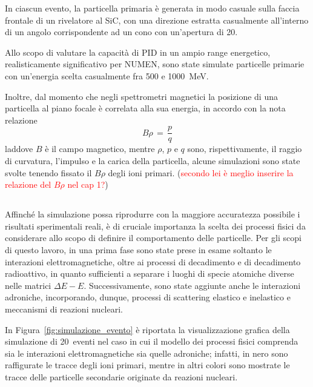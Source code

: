 In ciascun evento, la particella primaria è generata in modo casuale sulla faccia frontale di un rivelatore al SiC, con una direzione estratta casualmente all'interno di un angolo corrispondente ad un cono con un'apertura di 20\textdegree{}. 


Allo scopo di valutare la capacità di PID in un ampio range energetico, realisticamente significativo per NUMEN, sono state simulate particelle primarie con un'energia scelta casualmente fra 500 e 1000~MeV.

Inoltre, dal momento che negli spettrometri magnetici la posizione di una particella al piano focale è correlata alla sua energia, in accordo con la nota relazione
\begin{equation} \label{eq:legge_spettrometri}
B  \rho \, = \,  \frac{p}{q}
\end{equation}
laddove $B$ è il campo magnetico, mentre $\rho$, $p$ e $q$ sono, rispettivamente, il raggio di curvatura, l'impulso e la carica della particella, alcune simulazioni sono state svolte tenendo fissato il $B \rho$ degli ioni primari.
(\textcolor{red}{secondo lei è meglio inserire la relazione del $B \rho $ nel cap 1?})


\subsection{}


Affinché la simulazione possa riprodurre con la maggiore accuratezza possibile i risultati sperimentali reali, è di cruciale importanza la scelta dei processi fisici da considerare allo scopo di definire il comportamento delle particelle.
Per gli scopi di questo lavoro, in una prima fase sono state prese in esame soltanto le interazioni elettromagnetiche, oltre ai processi di decadimento e di decadimento radioattivo, in quanto sufficienti a separare i luoghi di specie atomiche diverse nelle matrici $\Delta E - E$.
Successivamente, sono state aggiunte anche le interazioni adroniche, incorporando, dunque, processi di scattering elastico e inelastico e meccanismi di reazioni nucleari.

In Figura~\ref{fig:simulazione_evento} è riportata la visualizzazione grafica della simulazione di 20~eventi nel caso in cui il modello dei processi fisici comprenda sia le interazioni elettromagnetiche sia quelle adroniche; infatti, in nero sono raffigurate le tracce degli ioni primari, mentre in altri colori sono mostrate le tracce delle particelle secondarie originate da reazioni nucleari. 



